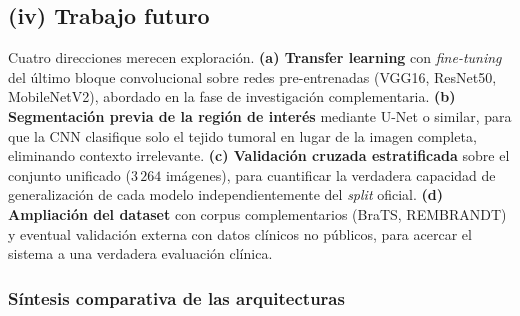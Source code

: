 \subsection*{(iv) Trabajo futuro}

Cuatro direcciones merecen exploración. \textbf{(a)
Transfer learning} con \textit{fine-tuning} del último bloque
convolucional sobre redes pre-entrenadas (VGG16, ResNet50,
MobileNetV2), abordado en la fase de investigación
complementaria. \textbf{(b) Segmentación previa de la región
de interés} mediante U-Net o similar, para que la CNN
clasifique solo el tejido tumoral en lugar de la imagen
completa, eliminando contexto irrelevante. \textbf{(c)
Validación cruzada estratificada} sobre el conjunto unificado
($3\,264$ imágenes), para cuantificar la verdadera capacidad
de generalización de cada modelo independientemente del
\textit{split} oficial. \textbf{(d) Ampliación del dataset} con
corpus complementarios (BraTS, REMBRANDT) y eventual validación
externa con datos clínicos no públicos, para acercar el sistema
a una verdadera evaluación clínica.

\subsubsection*{Síntesis comparativa de las arquitecturas}


